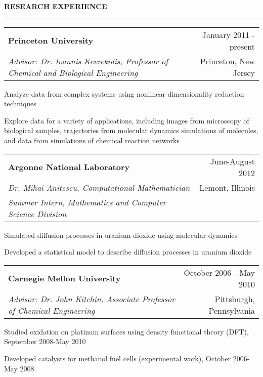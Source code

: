 \documentclass[letterpaper,10pt]{article}
\makeatletter
\newenvironment{itemize*}
  {\begin{itemize}
    \setlength{\parskip}{-3pt}}
  {\end{itemize}}
\newcommand{\cvheading}[1]{
\vspace{0.05in}
\noindent
\MakeUppercase{\bf #1}
\vspace{0.06in}
{\hrule height 0.3mm}
\vspace{0.06in}}
\newcommand{\workplace}[4]{
\noindent
\begin{tabular*}{1.0\textwidth}{@{\extracolsep{\fill}} l r}
{\bf #1} & #2\\
{\em #3} & #4\\
\end{tabular*}
}
\newcommand{\workplaceadvisor}[5]{
\noindent
\begin{tabular*}{1.0\textwidth}{@{\extracolsep{\fill}} l r}
{\bf #1} & #2\\
{\em #3} & #4\\
{\em #5} & \\
\end{tabular*}
}
\makeatother
\begin{document}
\cvheading{Research Experience}
\workplace{Princeton University}{January 2011 - present}{Advisor: Dr. Ioannis Kevrekidis, Professor of Chemical and Biological Engineering}{Princeton, New Jersey}
\begin{itemize*}
\item Analyze data from complex systems using nonlinear dimensionality reduction techniques%
\item Explore data for a variety of applications, including images from microscopy of biological samples, trajectories from molecular dynamics simulations of molecules, and data from simulations of chemical reaction networks
\end{itemize*}

\workplaceadvisor{Argonne National Laboratory}{June-August 2012}{Dr. Mihai Anitescu, Computational Mathematician}{Lemont, Illinois}{Summer Intern, Mathematics and Computer Science Division}
\begin{itemize*}
\item Simulated diffusion processes in uranium dioxide using molecular dynamics
\item Developed a statistical model to describe diffusion processes in uranium dioxide
\end{itemize*}

\workplace{Carnegie Mellon University}{October 2006 - May 2010}{Advisor: Dr. John Kitchin, Associate Professor of Chemical Engineering}{Pittsburgh, Pennsylvania}
\begin{itemize*}
\item Studied oxidation on platinum surfaces using density functional theory (DFT), September 2008-May 2010
\item Developed catalysts for methanol fuel cells (experimental work), October 2006-May 2008
\end{itemize*}
\end{document}

